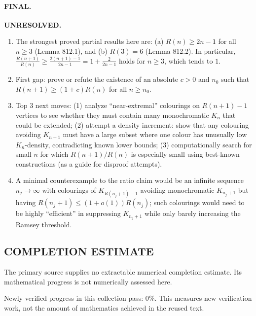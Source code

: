 \paragraph{FINAL.} \textbf{UNRESOLVED.}
\begin{enumerate}
\item[(i)] The strongest proved partial results here are: (a) $R(n)\ge 2n-1$ for all $n\ge3$ (Lemma 812.1), and (b) $R(3)=6$ (Lemma 812.2). In particular, $\frac{R(n+1)}{R(n)} \ge \frac{2(n+1)-1}{2n-1}=1+\frac{2}{2n-1}$ holds for $n\ge3$, which tends to $1$.
\item[(ii)] First gap: prove or refute the existence of an absolute $c>0$ and $n_0$ such that $R(n+1)\ge (1+c)R(n)$ for all $n\ge n_0$.
\item[(iii)] Top 3 next moves: (1) analyze ``near-extremal'' colourings on $R(n+1)-1$ vertices to see whether they must contain many monochromatic $K_n$ that could be extended; (2) attempt a density increment: show that any colouring avoiding $K_{n+1}$ must have a large subset where one colour has unusually low $K_n$-density, contradicting known lower bounds; (3) computationally search for small $n$ for which $R(n+1)/R(n)$ is especially small using best-known constructions (as a guide for disproof attempts).
\item[(iv)] A minimal counterexample to the ratio claim would be an infinite sequence $n_j\to\infty$ with colourings of $K_{R(n_j+1)-1}$ avoiding monochromatic $K_{n_j+1}$ but having $R(n_j+1) \le (1+o(1))R(n_j)$; such colourings would need to be highly ``efficient'' in suppressing $K_{n_j+1}$ while only barely increasing the Ramsey threshold.
\end{enumerate}




\subsection*{COMPLETION ESTIMATE}
The primary source supplies no extractable numerical completion estimate. Its mathematical progress is not numerically assessed here.

Newly verified progress in this collection pass: $0\%$. This measures new verification work, not the amount of mathematics achieved in the reused text.
